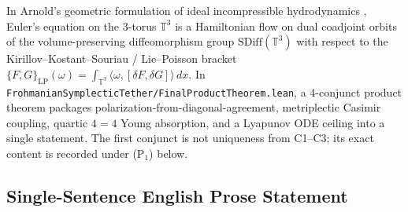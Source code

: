 \documentclass[11pt,a4paper]{article}
\theoremstyle{definition}
\begin{document}
In Arnold's geometric formulation of ideal incompressible hydrodynamics \cite{Arnold1966}, Euler's equation on the 3-torus $\mathbb{T}^3$ is a Hamiltonian flow on dual coadjoint orbits of the volume-preserving diffeomorphism group $\mathrm{SDiff}(\mathbb{T}^3)$ with respect to the Kirillov--Kostant--Souriau / Lie--Poisson bracket $\{F, G\}_{\mathrm{LP}}(\omega) = \int_{\mathbb{T}^3} \langle \omega, [\delta F, \delta G] \rangle\,dx$. In \texttt{FrohmanianSymplecticTether/FinalProductTheorem.lean}, a 4-conjunct product theorem packages polarization-from-diagonal-agreement, metriplectic Casimir coupling, quartic $4=4$ Young absorption, and a Lyapunov ODE ceiling into a single statement. The first conjunct is not uniqueness from C1--C3; its exact content is recorded under (P$_1$) below.

\subsection{Single-Sentence English Prose Statement}
\end{document}
